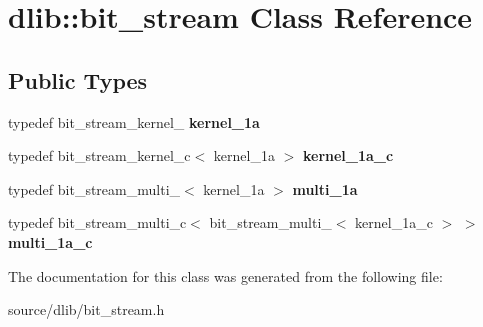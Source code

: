 \hypertarget{classdlib_1_1bit__stream}{
\section{dlib::bit\_\-stream Class Reference}
\label{classdlib_1_1bit__stream}
}
\subsection*{Public Types}
\begin{DoxyCompactItemize}
\item 
\hypertarget{classdlib_1_1bit__stream_a6bc419948ff65bfeaf389191b69d725a}{
typedef bit\_\-stream\_\-kernel\_ {\bfseries kernel\_\-1a}}
\label{classdlib_1_1bit__stream_a6bc419948ff65bfeaf389191b69d725a}

\item 
\hypertarget{classdlib_1_1bit__stream_a6de71620b3465f121dfc87289a2df203}{
typedef bit\_\-stream\_\-kernel\_\-c$<$ kernel\_\-1a $>$ {\bfseries kernel\_\-1a\_\-c}}
\label{classdlib_1_1bit__stream_a6de71620b3465f121dfc87289a2df203}

\item 
\hypertarget{classdlib_1_1bit__stream_ac0ac7fc1fdea1c1265eb1e2fdde1db68}{
typedef bit\_\-stream\_\-multi\_$<$ kernel\_\-1a $>$ {\bfseries multi\_\-1a}}
\label{classdlib_1_1bit__stream_ac0ac7fc1fdea1c1265eb1e2fdde1db68}

\item 
\hypertarget{classdlib_1_1bit__stream_a9f1b27a1dc04c614b664f10df478133a}{
typedef bit\_\-stream\_\-multi\_\-c$<$ bit\_\-stream\_\-multi\_$<$ kernel\_\-1a\_\-c $>$ $>$ {\bfseries multi\_\-1a\_\-c}}
\label{classdlib_1_1bit__stream_a9f1b27a1dc04c614b664f10df478133a}

\end{DoxyCompactItemize}


The documentation for this class was generated from the following file:\begin{DoxyCompactItemize}
\item 
source/dlib/bit\_\-stream.h\end{DoxyCompactItemize}
